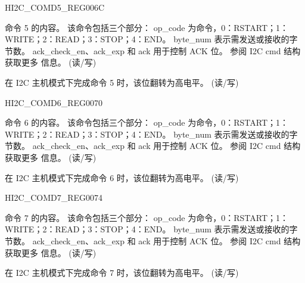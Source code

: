 \begin{register}{H}{I2C\_COMD5\_REG}{\hexprefix{}006C}\label{regdesc:I2CCOMD5REG}
%
%
%
\regnewline%
\begin{regdesc}\begin{reglist}
\label{fielddesc:I2CCOMMAND5}\item [I2C\_COMMAND5] 命令 5 的内容。 该命令包括三个部分：
op\_code 为命令，0：RSTART；1：WRITE；2：READ；3：STOP；4：END。
byte\_num 表示需发送或接收的字节数。
ack\_check\_en、ack\_exp 和 ack 用于控制 ACK 位。 参阅 I2C cmd 结构获取更多
信息。 (读/写)
\label{fielddesc:I2CCOMMAND5DONE}\item [I2C\_COMMAND5\_DONE] 在 I2C 主机模式下完成命令 5 时，该位翻转为高电平。 (读/写)
\end{reglist}\end{regdesc}
\end{register}


\begin{register}{H}{I2C\_COMD6\_REG}{\hexprefix{}0070}\label{regdesc:I2CCOMD6REG}
%
%
%
\regnewline%
\begin{regdesc}\begin{reglist}
\label{fielddesc:I2CCOMMAND6}\item [I2C\_COMMAND6] 命令 6 的内容。 该命令包括三个部分：
op\_code 为命令，0：RSTART；1：WRITE；2：READ；3：STOP；4：END。
byte\_num 表示需发送或接收的字节数。
ack\_check\_en、ack\_exp 和 ack 用于控制 ACK 位。 参阅 I2C cmd 结构获取更多
信息。 (读/写)
\label{fielddesc:I2CCOMMAND6DONE}\item [I2C\_COMMAND6\_DONE] 在 I2C 主机模式下完成命令 6 时，该位翻转为高电平。 (读/写)
\end{reglist}\end{regdesc}
\end{register}


\begin{register}{H}{I2C\_COMD7\_REG}{\hexprefix{}0074}\label{regdesc:I2CCOMD7REG}
%
%
%
\regnewline%
\begin{regdesc}\begin{reglist}
\label{fielddesc:I2CCOMMAND7}\item [I2C\_COMMAND7] 命令 7 的内容。 该命令包括三个部分：
op\_code 为命令，0：RSTART；1：WRITE；2：READ；3：STOP；4：END。
byte\_num 表示需发送或接收的字节数。
ack\_check\_en、ack\_exp 和 ack 用于控制 ACK 位。 参阅 I2C cmd 结构获取更多
信息。 (读/写)
\label{fielddesc:I2CCOMMAND7DONE}\item [I2C\_COMMAND7\_DONE] 在 I2C 主机模式下完成命令 7 时，该位翻转为高电平。 (读/写)
\end{reglist}\end{regdesc}
\end{register}


